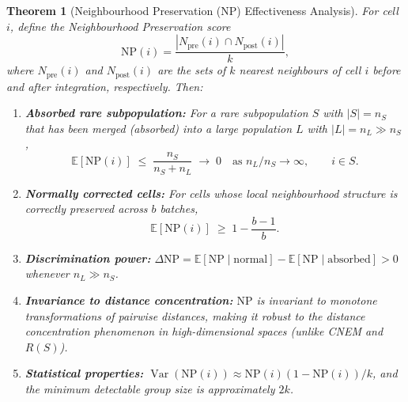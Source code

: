 \documentclass[11pt]{article}
\newtheorem{theorem}{Theorem}
\DeclareMathOperator{\Var}{Var}
\begin{document}
\bigskip


\begin{theorem}[Neighbourhood Preservation (NP) Effectiveness Analysis]
\label{thm:np}
For cell $i$, define the \emph{Neighbourhood Preservation} score
\[
    \mathrm{NP}(i) = \frac{|N_{\mathrm{pre}}(i) \cap N_{\mathrm{post}}(i)|}{k},
\]
where $N_{\mathrm{pre}}(i)$ and $N_{\mathrm{post}}(i)$ are the sets of $k$
nearest neighbours of cell $i$ before and after integration, respectively.
Then:
\begin{enumerate}
\item[\textup{(a)}] \textbf{Absorbed rare subpopulation:}
For a rare subpopulation $S$ with $|S| = n_S$ that has been merged
(absorbed) into a large population $L$ with $|L| = n_L \gg n_S$,
\[
    \mathbb{E}[\mathrm{NP}(i)] \;\le\; \frac{n_S}{n_S + n_L}
    \;\to\; 0 \quad\text{as } n_L/n_S \to \infty,
    \qquad i \in S.
\]

\item[\textup{(b)}] \textbf{Normally corrected cells:}
For cells whose local neighbourhood structure is correctly preserved
across $b$ batches,
\[
    \mathbb{E}[\mathrm{NP}(i)] \;\ge\; 1 - \frac{b-1}{b}.
\]

\item[\textup{(c)}] \textbf{Discrimination power:}
$\Delta\mathrm{NP} = \mathbb{E}[\mathrm{NP}\mid\text{normal}]
- \mathbb{E}[\mathrm{NP}\mid\text{absorbed}] > 0$ whenever
$n_L \gg n_S$.

\item[\textup{(d)}] \textbf{Invariance to distance concentration:}
$\mathrm{NP}$ is invariant to monotone transformations of pairwise
distances, making it robust to the distance concentration phenomenon
in high-dimensional spaces (unlike CNEM and $R(S)$).

\item[\textup{(e)}] \textbf{Statistical properties:}
$\Var(\mathrm{NP}(i)) \approx \mathrm{NP}(i)(1 - \mathrm{NP}(i))/k$,
and the minimum detectable group size is approximately $2k$.
\end{enumerate}
\end{theorem}
\end{document}
